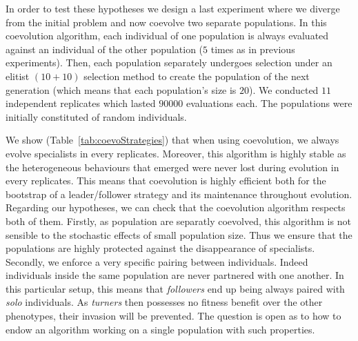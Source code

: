     In order to test these hypotheses we design a last experiment where we diverge from the initial problem and now coevolve two separate populations. In this coevolution algorithm, each individual of one population is always evaluated against an individual of the other population ($5$ times as in previous experiments). Then, each population separately undergoes selection under an elitist \((10+10)\) selection method to create the population of the next generation (which means that each population's size is $20$). We conducted $11$ independent replicates which lasted $90000$ evaluations each. The populations were initially constituted of random individuals.

    \begin{table}[hbtp]
      \caption{\textbf{Strategies evolved by the best individuals when coevolving two populations.} Repartition of the different strategies adopted by the best individuals at the last evaluation in each of the $11$ replicates. We indicate in each cell the number of simulations where a particular strategy evolved. Two populations were coevolved under elitist selection and the individuals' genotype values were initially random. In the table "L/F" stands for leader/follower and "NC" for "Non-Cooperative".}
      \label{tab:coevoStrategies}
    \end{table}

    We show (Table~\ref{tab:coevoStrategies}) that when using coevolution, we always evolve specialists in every replicates. Moreover, this algorithm is highly stable as the heterogeneous behaviours that emerged were never lost during evolution in every replicates. This means that coevolution is highly efficient both for the bootstrap of a leader/follower strategy and its maintenance throughout evolution. Regarding our hypotheses, we can check that the coevolution algorithm respects both of them. Firstly, as population are separatly coevolved, this algorithm is not sensible to the stochastic effects of small population size. Thus we ensure that the populations are highly protected against the disappearance of specialists. Secondly, we enforce a very specific pairing between individuals. Indeed individuals inside the same population are never partnered with one another. In this particular setup, this means that \emph{followers} end up being always paired with \emph{solo} individuals. As \emph{turners} then possesses no fitness benefit over the other phenotypes, their invasion will be prevented. The question is open as to how to endow an algorithm working on a single population with such properties.

